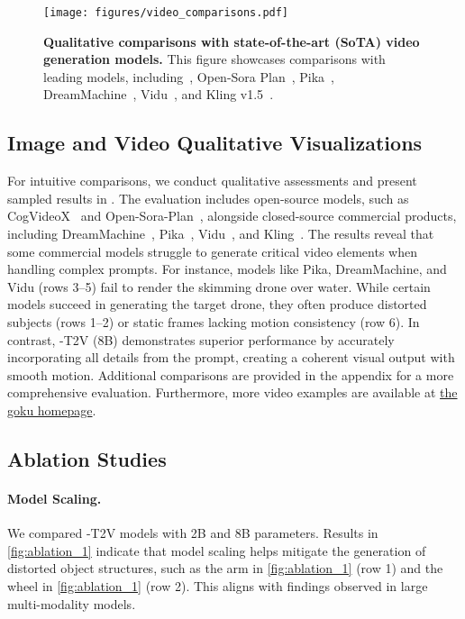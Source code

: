 \begin{figure}[t]
\centering
\texttt{[image: figures/video\_comparisons.pdf]} \\
\caption{\textbf{Qualitative comparisons with state-of-the-art (SoTA) video generation models.} This figure showcases comparisons with leading models, including~\citep{yang2024cogvideox}, Open-Sora Plan~\citep{pku_yuan_lab_and_tuzhan_ai_etc_2024_10948109}, Pika~\citep{pika}, DreamMachine~\citep{DreamMachine}, Vidu~\citep{bao2024vidu}, and Kling v1.5~\citep{kuaishou2024klingai}.}
\label{fig:video-sota}
\end{figure}

\subsection{Image and Video Qualitative Visualizations}\label{sec:overall-qualitative-results}


For intuitive comparisons, we conduct qualitative assessments and present sampled results in . The evaluation includes open-source models, such as CogVideoX~\citep{yang2024cogvideox} and Open-Sora-Plan~\citep{opensora}, alongside closed-source commercial products, including DreamMachine~\citep{DreamMachine}, Pika~\citep{pika}, Vidu~\citep{bao2024vidu}, and Kling~\citep{kuaishou2024klingai}. The results reveal that some commercial models struggle to generate critical video elements when handling complex prompts. For instance, models like Pika, DreamMachine, and Vidu (rows 3–5) fail to render the skimming drone over water. While certain models succeed in generating the target drone, they often produce distorted subjects (rows 1–2) or static frames lacking motion consistency (row 6). In contrast, \ours-T2V (8B) demonstrates superior performance by accurately incorporating all details from the prompt, creating a coherent visual output with smooth motion. Additional comparisons are provided in the appendix for a more comprehensive evaluation. Furthermore, more video examples are available at \href{https://saiyan-world.github.io/goku/}{the goku homepage}.

\subsection{Ablation Studies}

\paragraph{Model Scaling.} We compared \ours-T2V models with 2B and 8B parameters. Results in \cref{fig:ablation_1} indicate that model scaling helps mitigate the generation of distorted object structures, such as the arm in \cref{fig:ablation_1} (row 1) and the wheel in \cref{fig:ablation_1} (row 2). This aligns with findings observed in large multi-modality models.





